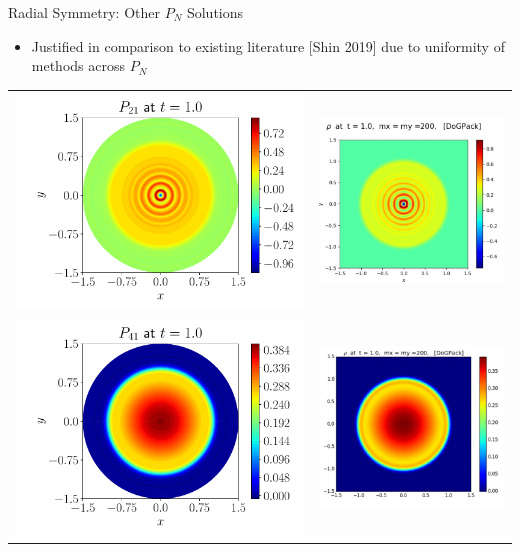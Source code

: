 \documentclass{beamer}
\begin{document}
\begin{frame}{Radial Symmetry: Other $P_N$ Solutions}
    \begin{itemize}
        \item Justified in comparison to existing literature [Shin 2019] due to uniformity of methods across $P_N$
    \end{itemize}
    \centering
    \begin{tabular}{c|c}                    
        \includegraphics[width=0.35\linewidth]{figures/physical_final_p21.pdf} &
        \includegraphics[width=0.3\linewidth]{figures/Minwoo_p21.png} \\
        \includegraphics[width=0.35\linewidth]{figures/physical_final_p41.pdf} &
        \includegraphics[width=0.3\linewidth]{figures/Minwoo_p61.png}
    \end{tabular}
\end{frame}
\end{document}

